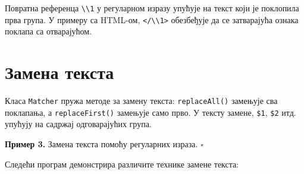 Повратна референца \texttt{\textbackslash{}\textbackslash{}1} у регуларном изразу упућује на текст који је поклопила прва група. У примеру са HTML-ом, \texttt{\textless{}/\textbackslash{}\textbackslash{}1\textgreater{}} обезбеђује да се затварајућа ознака поклапа са отварајућом.


\section{Замена текста}

Класа \texttt{Matcher} пружа методе за замену текста: \texttt{replaceAll()} замењује сва поклапања, а \texttt{replaceFirst()} замењује само прво. У тексту замене, \texttt{\$1}, \texttt{\$2} итд. упућују на садржај одговарајућих група.


\bigskip

\noindent \textbf{Пример 3.} Замена текста помоћу регуларних израза. $\square$

\medskip

Следећи програм демонстрира различите технике замене текста:


